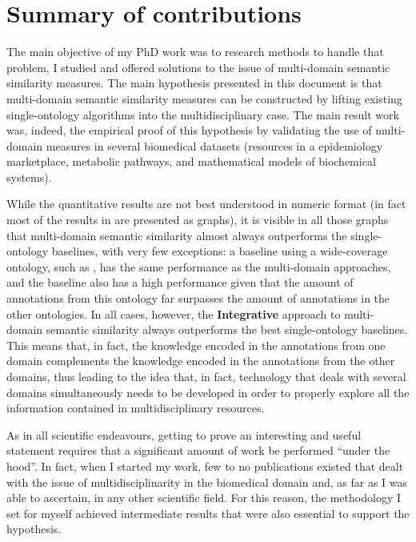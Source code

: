 \section{Summary of contributions} \label{sec:conclusions/contributions}

The main objective of my PhD work was to research methods to handle that problem, \ie I studied and offered solutions to the issue of multi-domain semantic similarity measures. The main hypothesis presented in this document is that multi-domain semantic similarity measures can be constructed by lifting existing single-ontology algorithms into the multidisciplinary case. The main result work was, indeed, the empirical proof of this hypothesis by validating the use of multi-domain measures in several biomedical datasets (resources in a epidemiology marketplace, metabolic pathways, and mathematical models of biochemical systems).

While the quantitative results are not best understood in numeric format (in fact most of the results in  are presented as graphs), it is visible in all those graphs that multi-domain semantic similarity almost always outperforms the single-ontology baselines, with very few exceptions: \eg a baseline using a wide-coverage ontology, such as , has the same performance as the multi-domain approaches, and the  baseline also has a high performance given that the amount of annotations from this ontology far surpasses the amount of annotations in the other ontologies. In all cases, however, the \textbf{Integrative} approach to multi-domain semantic similarity always outperforms the best single-ontology baselines. This means that, in fact, the knowledge encoded in the annotations from one domain complements the knowledge encoded in the annotations from the other domains, thus leading to the idea that, in fact, technology that deals with several domains simultaneously needs to be developed in order to properly explore all the information contained in multidisciplinary resources.

As in all scientific endeavours, getting to prove an interesting and useful statement requires that a significant amount of work be performed ``under the hood''. In fact, when I started my work, few to no publications existed that dealt with the issue of multidisciplinarity in the biomedical domain and, as far as I was able to ascertain, in any other scientific field. For this reason, the methodology I set for myself achieved intermediate results that were also essential to support the hypothesis.

